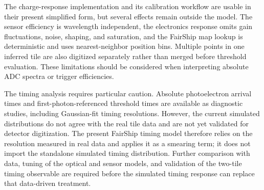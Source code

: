 The charge-response implementation and its calibration workflow are usable
in their present simplified form, but several effects remain outside the
model.  The sensor efficiency is wavelength independent, the electronics
response omits gain fluctuations, noise, shaping, and saturation, and the
FairShip map lookup is deterministic and uses nearest-neighbor position bins.
Multiple points in one inferred tile are also digitized separately rather
than merged before threshold evaluation.  These limitations should be
considered when interpreting absolute ADC spectra or trigger efficiencies.

The timing analysis requires particular caution.  Absolute photoelectron
arrival times and first-photon-referenced threshold times are available as
diagnostic studies, including Gaussian-fit timing resolutions.  However, the
current simulated distributions do not agree with the real tile data and are
not yet validated for detector digitization.  The present FairShip timing
model therefore relies on the resolution measured in real data and applies it
as a smearing term; it does not import the standalone simulated timing
distribution.  Further comparison with data, tuning of the optical and sensor
models, and validation of the two-tile timing observable are required before
the simulated timing response can replace that data-driven treatment.

